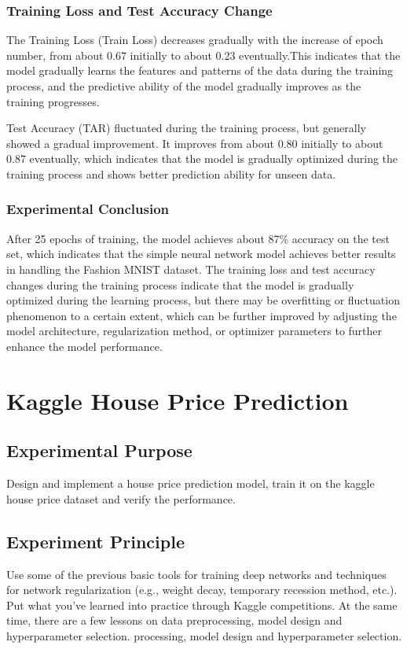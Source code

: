 \documentclass[a4paper,12pt]{article}
\begin{document}
\subsubsection{Training Loss and Test Accuracy Change}
The Training Loss (Train Loss) decreases gradually with the increase of epoch number, from about 0.67 initially to about 0.23 eventually.This indicates that the model gradually learns the features and patterns of the data during the training process, and the predictive ability of the model gradually improves as the training progresses.

Test Accuracy (TAR) fluctuated during the training process, but generally showed a gradual improvement. It improves from about 0.80 initially to about 0.87 eventually, which indicates that the model is gradually optimized during the training process and shows better prediction ability for unseen data.
\subsubsection{Experimental Conclusion}

After 25 epochs of training, the model achieves about 87\% accuracy on the test set, which indicates that the simple neural network model achieves better results in handling the Fashion MNIST dataset.
The training loss and test accuracy changes during the training process indicate that the model is gradually optimized during the learning process, but there may be overfitting or fluctuation phenomenon to a certain extent, which can be further improved by adjusting the model architecture, regularization method, or optimizer parameters to further enhance the model performance.

\newpage
\section{Kaggle House Price Prediction}
\subsection{Experimental Purpose}
Design and implement a house price prediction model, train it on the kaggle house price dataset and verify the performance.

\subsection{Experiment Principle}
Use some of the previous basic tools for training deep networks and techniques for network regularization (e.g., weight decay,
temporary recession method, etc.). Put what you've learned into practice through Kaggle competitions. At the same time, there are a few lessons on data preprocessing, model design and hyperparameter selection.
processing, model design and hyperparameter selection.
\end{document}
